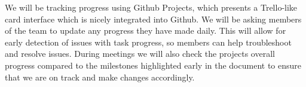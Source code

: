 \documentclass{article}
\begin{document}
We will be tracking progress using Github Projects, which presents a Trello-like card interface which is nicely integrated into Github. We will be asking members of the team to update any progress they have made daily. This will allow for early detection of issues with task progress, so members can help troubleshoot and resolve issues. During meetings we will also check the projects overall progress compared to the milestones highlighted early in the document to ensure that we are on track and make changes accordingly.



\end{document}
